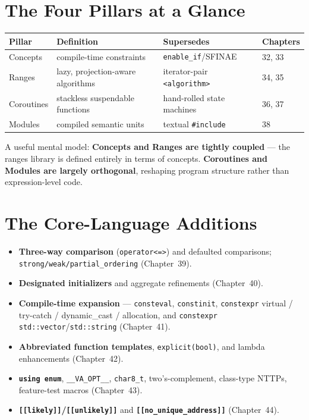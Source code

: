 \section{The Four Pillars at a Glance}
\label{sec:c20-pillars}

\begin{center}
\begin{tabular}{llll}
\hline
\textbf{Pillar} & \textbf{Definition} & \textbf{Supersedes} & \textbf{Chapters} \\
\hline
Concepts & compile-time constraints & \texttt{enable\_if}/SFINAE & 32, 33 \\
Ranges & lazy, projection-aware algorithms & iterator-pair \texttt{<algorithm>} & 34, 35 \\
Coroutines & stackless suspendable functions & hand-rolled state machines & 36, 37 \\
Modules & compiled semantic units & textual \texttt{\#include} & 38 \\
\hline
\end{tabular}
\end{center}

A useful mental model: \textbf{Concepts and Ranges are tightly coupled} --- the ranges library is defined entirely in terms of concepts. \textbf{Coroutines and Modules are largely orthogonal}, reshaping program structure rather than expression-level code.

\section{The Core-Language Additions}
\label{sec:c20-core-additions}

\begin{itemize}
\item \textbf{Three-way comparison} (\texttt{operator<=>}) and defaulted comparisons; \texttt{strong/weak/partial\_ordering} (Chapter~39).
\item \textbf{Designated initializers} and aggregate refinements (Chapter~40).
\item \textbf{Compile-time expansion} --- \texttt{consteval}, \texttt{constinit}, \texttt{constexpr} virtual / try-catch / dynamic\_cast / allocation, and \texttt{constexpr std::vector}/\texttt{std::string} (Chapter~41).
\item \textbf{Abbreviated function templates}, \texttt{explicit(bool)}, and lambda enhancements (Chapter~42).
\item \textbf{\texttt{using enum}}, \texttt{\_\_VA\_OPT\_\_}, \texttt{char8\_t}, two's-complement, class-type NTTPs, feature-test macros (Chapter~43).
\item \textbf{\texttt{[[likely]]}/\texttt{[[unlikely]]}} and \textbf{\texttt{[[no\_unique\_address]]}} (Chapter~44).
\end{itemize}

